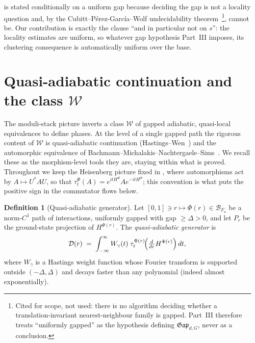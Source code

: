 \documentclass[12pt]{article}
\newcommand{\Ffun}{F}                          %
\newcommand{\Gap}{\mathfrak{Gap}}              %
\newcommand{\Weq}{\mathcal{W}}                 %
\newcommand{\gapbound}{\Delta}                  %
\theoremstyle{definition}
\newtheorem{definition}[theorem]{Definition}
\theoremstyle{remark}
\begin{document}
 is stated conditionally on a uniform gap because deciding the gap is not
a locality question and, by the Cubitt--P\'erez-Garc\'ia--Wolf undecidability
theorem~\cite{cpw-undecidable}\footnote{Cited for scope, not used: there is no algorithm
deciding whether a translation-invariant nearest-neighbour family is gapped. Part~III therefore
treats ``uniformly gapped'' as the hypothesis defining $\Gap_{d,G}$, never as a conclusion.},
cannot be. Our contribution is exactly the clause ``and in particular not on $s$'': the
locality estimates are uniform, so whatever gap hypothesis Part~III imposes, its clustering
consequence is automatically uniform over the base.

\section{Quasi-adiabatic continuation and the class \texorpdfstring{$\Weq$}{W}}
\label{sec:qac}

The moduli-stack picture inverts a class $\Weq$ of gapped adiabatic, quasi-local equivalences
to define phases. At the level of a single gapped path the rigorous content of $\Weq$ is
quasi-adiabatic continuation (Hastings--Wen~\cite{hastings-wen-qac}) and the automorphic
equivalence of Bachmann--Michalakis--Nachtergaele--Sims~\cite{bmns-automorphic}. We recall
these as the morphism-level tools they are, staying within what is proved. Throughout we keep
the Heisenberg picture fixed in , where automorphisms act by
$A\mapsto U^*AU$, so that $\tau^\Phi_t(A)=e^{itH^\Phi}Ae^{-itH^\Phi}$; this convention is what
puts the positive sign in the commutator flows below.

\begin{definition}[Quasi-adiabatic generator]
\label{def:qac}
Let $[0,1]\ni r\mapsto\Phi(r)\in\mathcal B_{\Ffun_a}$ be a norm-$C^1$ path of interactions,
uniformly gapped with gap $\ge\gapbound>0$, and let $P_r$ be the ground-state projection of
$H^{\Phi(r)}$. The \emph{quasi-adiabatic generator} is
\[
  \mathcal D(r)\;=\;\int_{-\infty}^{\infty} W_\gamma(t)\;
     \tau^{\Phi(r)}_t\!\Bigl(\tfrac{d}{dr}H^{\Phi(r)}\Bigr)\,dt,
\]
where $W_\gamma$ is a Hastings weight function whose Fourier transform is supported outside
$(-\gapbound,\gapbound)$ and decays faster than any polynomial (indeed almost exponentially).
\end{definition}
\end{document}
